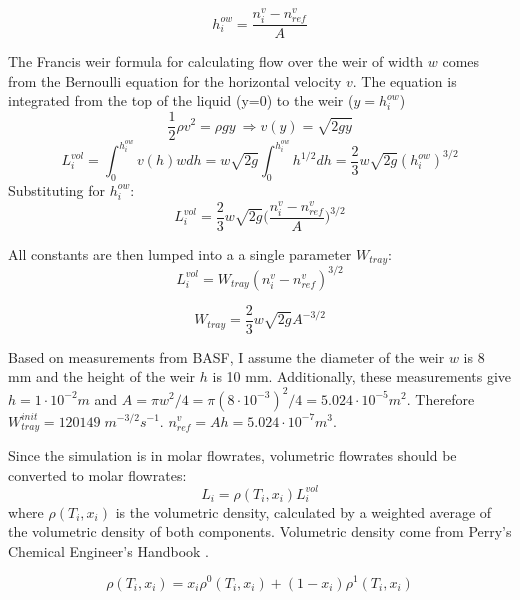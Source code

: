 \begin{equation}
    h^{ow}_i = \frac{n^v_i-n^v_{ref}}{A}
\end{equation}

\noindent The Francis weir formula for calculating flow over the weir of width $w$ comes from the Bernoulli equation for the horizontal velocity $v$. The equation is integrated from the top of the liquid (y=0) to the weir ($y=h_i^{ow}$)
\begin{equation}
    \frac{1}{2} \rho v^2 = \rho g y \ \Longrightarrow v(y) = \sqrt{2gy}
\end{equation}
\begin{equation}
    L_i^{vol} = \int_0^{h_i^{ow}} v(h)wdh = w\sqrt{2g}\int_0^{h_i^{ow}} h^{1/2}dh = \frac{2}{3}w\sqrt{2g}(h_i^{ow})^{3/2} 
\end{equation}
Substituting for $h_i^{ow}$:
\begin{equation}
   L_i^{vol} = \frac{2}{3} w\sqrt{2g}\biggl(\frac{n^v_i-n^v_{ref}}{A}\biggr)^{3/2}  
\end{equation}

\nonindent All constants are then lumped into a a single parameter $W_{tray}$:
\begin{equation}
    L_i^{vol} = W_{tray}(n_i^v-n^v_{ref})^{3/2}
\end{equation}

\begin{equation}
    W_{tray} = \frac{2}{3}w\sqrt{2g}A^{-3/2}
\end{equation}

Based on measurements from BASF, I assume the diameter of the weir $w$ is 8 mm and the height of the weir $h$ is 10 mm. Additionally, these measurements give $h = 1\cdot10^{-2} m$ and $A=\pi w^2/4 = \pi(8 \cdot 10^{-3})^2/4 = 5.024 \cdot 10^{-5} m^2$. Therefore $W_{tray}^{init}=120149 \; m^{-3/2}s^{-1}$. $n^v_{ref}=Ah=5.024 \cdot 10^{-7} m^3$. 

Since the simulation is in molar flowrates, volumetric flowrates should be converted to molar flowrates:
\begin{equation}
    L_i = \rho(T_i, x_i)L^{vol}_i  
\end{equation}
where $\rho(T_i,x_i)$ is the volumetric density, calculated by a weighted average of the volumetric density of both components. Volumetric density come from Perry’s Chemical Engineer's Handbook \cite{Perrys2018}.

\begin{equation}
    \rho(T_i, x_i) = x_i\rho^0(T_i, x_i) + (1-x_i)\rho^1(T_i, x_i)
\end{equation}

